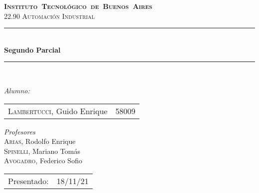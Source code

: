 \begin{titlepage}
\newcommand{\HRule}{\rule{\linewidth}{0.5mm}}
\center
\mbox{\textsc{\LARGE \bfseries {Instituto Tecnológico de Buenos Aires}}}\\[1.5cm]
\textsc{\Large 22.90  Automaci\'on Industrial}\\[0.5cm]


\HRule \\[0.6cm]
{ \Huge \bfseries Segundo Parcial}\\[0.4cm] 
\HRule \\[1.5cm]


{\large

\emph{Alumno:}\\
\vspace{3pt}

\begin{tabular}{lr} 	
\textsc{Lambertucci}, Guido Enrique  & 58009 \\

\end{tabular}

\vspace{20pt}

\emph{Profesores}\\
\textsc{Arias}, Rodolfo Enrique  \\
\vspace{3pt}
\textsc{Spinelli}, Mariano Tomás \\	
\vspace{3pt}
\textsc{Avogadro}, Federico Sofio \\	
\vspace{3pt}
\vspace{100pt}

\begin{tabular}{ll}

Presentado: & 18/11/21\\

\end{tabular}

}

\vfill

\end{titlepage}